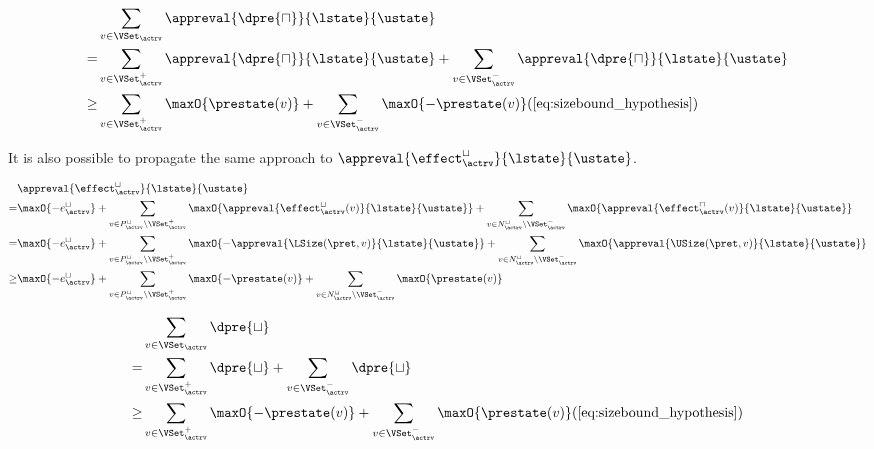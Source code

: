 \begin{equation} \label{eq:d_upper_reduction}
  \begin{split} 
  & \sum_{v \in \VSet_\actrv} \appreval{\dpre{\sqcap}}{\lstate}{\ustate} \\
  = & \sum_{v \in \VSet^+_\actrv} \appreval{\dpre{\sqcap}}{\lstate}{\ustate} + \sum_{v \in \VSet^-_\actrv} \appreval{\dpre{\sqcap}}{\lstate}{\ustate} \\
  \geq & \sum_{v \in \VSet^+_\actrv} \maxO{\prestate(v)} + \sum_{v \in \VSet^-_\actrv} \maxO{-\prestate(v)} (\ref{eq:sizebound_hypothesis}) \\
  \end{split}      
\end{equation}

It is also possible to propagate the same approach to $\appreval{\effect^\sqcup_\actrv}{\lstate}{\ustate}$.


\begin{equation} \label{eq:input_rv_reduction_lower}
  \begin{split}
  & \appreval{\effect^\sqcup_\actrv}{\lstate}{\ustate} \\
  = & \maxO{-e^{\sqcup}_\actrv}
    + \sum_{v \in P_\actrv^\sqcup \setminus \VSet^+_\actrv} \maxO{\appreval{\effect^\sqcup_\actrv(v)}{\lstate}{\ustate}}
    + \sum_{v \in N_\actrv^\sqcup \setminus \VSet^-_\actrv} \maxO{\appreval{\effect^\sqcap_\actrv(v)}{\lstate}{\ustate}} \\
  = & \maxO{-e^{\sqcup}_\actrv}
    + \sum_{v \in P_\actrv^\sqcup \setminus \VSet^+_\actrv} \maxO{-\appreval{\LSize(\pret, v)}{\lstate}{\ustate}}
    + \sum_{v \in N_\actrv^\sqcup \setminus \VSet^-_\actrv} \maxO{\appreval{\USize(\pret, v)}{\lstate}{\ustate}} \\
  \geq & \maxO{-e^{\sqcup}_\actrv}
    + \sum_{v \in P_\actrv^\sqcup \setminus \VSet^+_\actrv} \maxO{-\prestate(v)}
    + \sum_{v \in N_\actrv^\sqcup \setminus \VSet^-_\actrv} \maxO{\prestate(v)} \\
  \end{split}
\end{equation}

\begin{equation} \label{eq:d_lower_reduction}
  \begin{split} 
  & \sum_{v \in \VSet_\actrv} \dpre{\sqcup} \\
  = & \sum_{v \in \VSet^+_\actrv} \dpre{\sqcup} + \sum_{v \in \VSet^-_\actrv} \dpre{\sqcup} \\
  \geq & \sum_{v \in \VSet^+_\actrv} \maxO{-\prestate(v)} + \sum_{v \in \VSet^-_\actrv} \maxO{\prestate(v)} (\ref{eq:sizebound_hypothesis}) \\
  \end{split}      
\end{equation}

